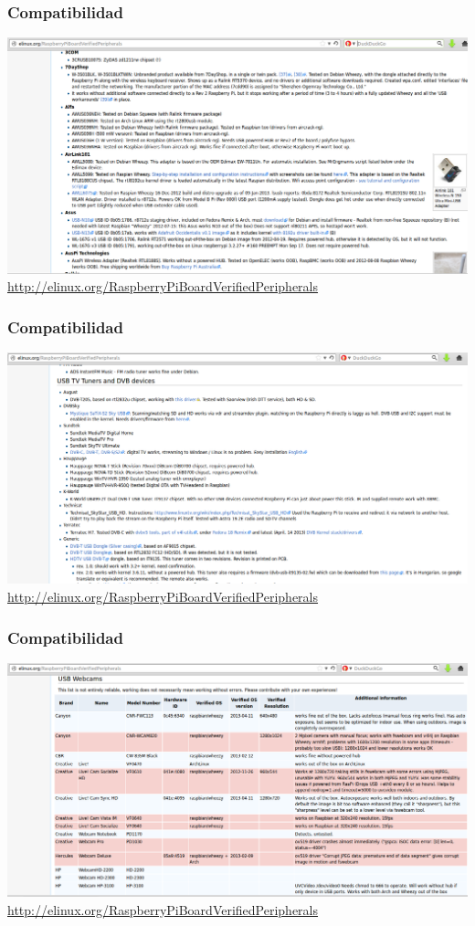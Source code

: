 \documentclass[10pt,colorlinks]{beamer}
\begin{document}
\begin{frame}[plain]\frametitle{Compatibilidad}
    \includegraphics[width=\textwidth]{figs/elinux3}\\
\href{http://elinux.org/RaspberryPiBoardVerifiedPeripherals}{http://elinux.org/RaspberryPiBoardVerifiedPeripherals}
\end{frame}


\begin{frame}[plain]\frametitle{Compatibilidad}
    \includegraphics[width=\textwidth]{figs/elinux4}\\
\href{http://elinux.org/RaspberryPiBoardVerifiedPeripherals}{http://elinux.org/RaspberryPiBoardVerifiedPeripherals}
\end{frame}


\begin{frame}[plain]\frametitle{Compatibilidad}
    \includegraphics[width=\textwidth]{figs/elinux5}\\
\href{http://elinux.org/RaspberryPiBoardVerifiedPeripherals}{http://elinux.org/RaspberryPiBoardVerifiedPeripherals}
\end{frame}
\end{document}
